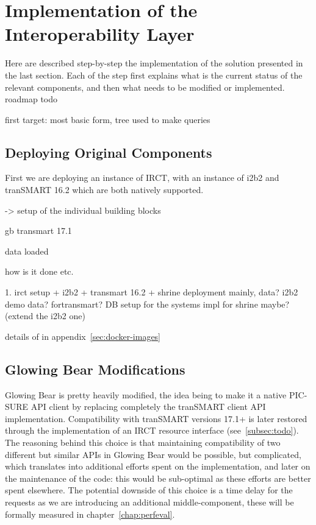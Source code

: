 \section{Implementation of the Interoperability Layer}
Here are described step-by-step the implementation of the solution presented in the last section. 
Each of the step first explains what is the current status of the relevant components, and then what needs to be modified or implemented.
roadmap todo


first target: most basic form, tree used to make queries


\subsection{Deploying Original Components}
First we are deploying an instance of IRCT, with an instance of i2b2 and tranSMART 16.2 which are both natively supported. 

-> setup of the individual building blocks

gb
transmart 17.1

data loaded

how is it done etc.

1. irct setup + i2b2 + transmart 16.2 + shrine
deployment mainly, data? i2b2 demo data? fortransmart? 
DB setup for the systems
impl for shrine maybe? (extend the i2b2 one)

details of in appendix~\ref{sec:docker-images}


\subsection{Glowing Bear Modifications}

Glowing Bear is pretty heavily modified, the idea being to make it a native PIC-SURE API client by replacing completely the tranSMART client API implementation. 
Compatibility with tranSMART versions 17.1+ is later restored through the implementation of an IRCT resource interface (see~\ref{subsec:todo}).
The reasoning behind this choice is that maintaining compatibility of two different but similar APIs in Glowing Bear would be possible, but complicated, which translates into additional efforts spent on the implementation, and later on the maintenance of the code: this would be sub-optimal as these efforts are better spent elsewhere.
The potential downside of this choice is a time delay for the requests as we are introducing an additional middle-component, these will be formally measured in chapter~\ref{chap:perfeval}.

